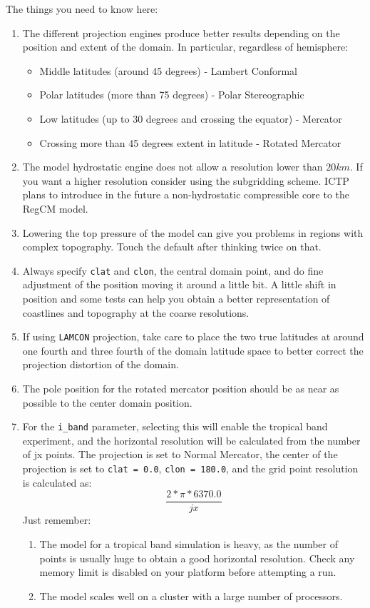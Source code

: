 The things you need to know here:

\begin{enumerate}
\item The different projection engines produce better results depending on the
position and extent of the domain. In particular, regardless of hemisphere:
\begin{itemize}
\item Middle latitudes (around 45 degrees) - Lambert Conformal
\item Polar latitudes (more than 75 degrees) - Polar Stereographic
\item Low latitudes (up to 30 degrees and crossing the equator) - Mercator
\item Crossing more than 45 degrees extent in latitude - Rotated Mercator
\end{itemize}
\item The model hydrostatic engine does not allow a resolution lower than
$20 km$. If you want a higher resolution consider using the subgridding scheme.
ICTP plans to introduce in the future a non-hydrostatic compressible core to
the RegCM model.
\item Lowering the top pressure of the model can give you problems in regions
with complex topography. Touch the default after thinking twice on that.
\item Always specify \verb=clat= and \verb=clon=, the central domain point,
and do fine adjustment of the position moving it around a little bit. A
little shift in position and some tests can help you obtain a better
representation of coastlines and topography at the coarse resolutions.
\item If using \verb=LAMCON= projection, take care to place the two
true latitudes at around one fourth and three fourth of the domain latitude
space to better correct the projection distortion of the domain.
\item The pole position for the rotated mercator position should be as near as
possible to the center domain position.
\item For the \verb=i_band= parameter, selecting this will enable the tropical
band experiment, and the horizontal resolution will be calculated from the
number of jx points.
The projection is set to Normal Mercator, the center of the projection is set
to \verb'clat = 0.0', \verb'clon = 180.0',
and the grid point resolution is calculated as:
\begin{equation}
\frac{2*\pi*6370.0}{jx}
\end{equation}
Just remember:
\begin{enumerate}
\item The model for a tropical band simulation is heavy, as the number of points
is usually huge to obtain a good horizontal resolution. Check any memory
limit is disabled on your platform before attempting a run.
\item The model scales well on a cluster with a large number of processors.
\end{enumerate}

\end{enumerate}

